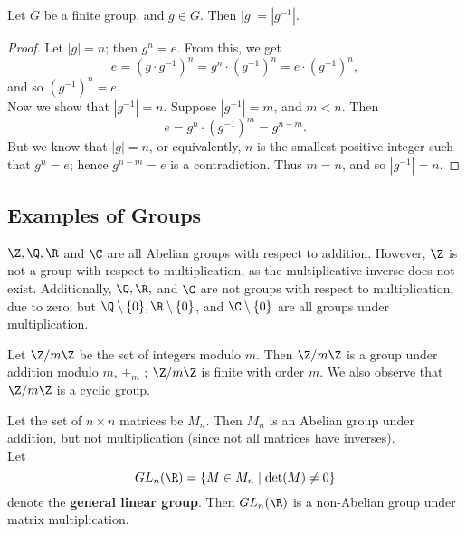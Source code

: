 \documentclass[math1530-lecture-notes]{subfiles}
\begin{document}
\begin{proposition}{}
  Let $G$ be a finite group, and $g\in G$. Then $\left| g \right| =\left| g^{-1} \right| $.
\end{proposition}
\begin{proof}[Proof]
  Let $\left| g \right| =n$; then $g^{n}=e$. From this, we get \[
    e = (g\cdot g^{-1})^{n}=g^{n}\cdot (g^{-1})^{n}=e\cdot (g^{-1})^{n}
  ,\] and so $(g^{-1})^{n}=e$. \\
  Now we show that $\left| g^{-1} \right| =n$. Suppose $\left| g^{-1} \right| =m$, and $m<n$.  Then
  \[
    e=g^{n}\cdot (g^{-1})^{m}=g^{n-m}
  .\] But we know that  $\left| g \right| =n$, or equivalently, $n$ is the smallest positive integer
  such that $g^{n}=e$; hence $g^{n-m}=e$ is a contradiction. Thus $m=n$, and so  $\left| g^{-1}
  \right| =n$.
\end{proof}



\subsection{Examples of Groups}
\begin{example}
  $\Z,\Q,\R$ and $\C$ are all Abelian groups with respect to addition. However, $\Z$ is not a group
  with respect to multiplication, as the multiplicative inverse does not exist. Additionally,
  $\Q,\R,$ and $\C$ are not groups with respect to multiplication, due to zero; but $\Q\setminus \{
  0\}, \R\setminus \{ 0 \}$, and $ \C\setminus \{ 0 \}$ are all groups under multiplication.
\end{example}

\begin{example}
  Let $\Z/m\Z$ be the set of integers modulo $m$. Then  $\Z / m\Z$ is a group under addition
  modulo $m$, $+_m$ ; $\Z / m\Z$ is finite with order $m$. We also observe that $\Z/m\Z$ is a cyclic
  group.
\end{example}

\begin{example}
  Let the set of $n\times n$ matrices be $M_n$. Then  $M_n$ is an Abelian group under addition, but
  not multiplication (since not all matrices have inverses).\\

  Let \[GL_n(\R)=\{M\in M_n\mid \det(M)\neq 0\}\] denote the \textbf{general linear group}. Then
  $GL_n(\R)$ is a non-Abelian group under matrix multiplication.
\end{example}
\end{document}

